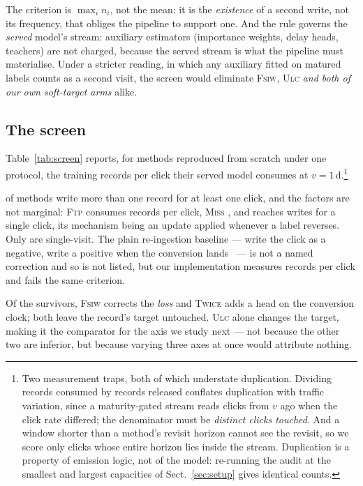 The criterion is $\max_i n_i$, not the mean: it is the \emph{existence} of a second write, not
its frequency, that obliges the pipeline to support one. And the rule governs the \emph{served} model's stream: auxiliary estimators (importance
weights, delay heads, teachers) are not charged, because the served stream is what the pipeline
must materialise. Under a stricter reading, in which any auxiliary fitted on matured labels
counts as a second visit, the screen would eliminate \textsc{Fsiw}, \textsc{Ulc} \emph{and
both of our own soft-target arms} alike.

\subsection{The screen}

Table~\ref{tab:screen} reports, for \nScreened{} methods reproduced from scratch under one
protocol, the training records per click their served model consumes at $v=1$\,d.\footnote{Two measurement traps, both of which understate duplication.
Dividing records consumed by records released conflates duplication with traffic variation,
since a maturity-gated stream reads clicks from $v$ ago when the click rate differed; the
denominator must be \emph{distinct clicks touched}. And a window shorter than a method's revisit
horizon cannot see the revisit, so we score only clicks whose entire horizon lies inside the
stream. Duplication is a property of emission logic, not of the model: re-running the audit at
the smallest and largest capacities of Sect.~\ref{sec:setup} gives identical counts.}

\begin{table}[t]
\centering
\caption{The single-visit screen at $v=1$\,d. \emph{Records/click} is the lifetime number of
training records the served model consumes per distinct click; \emph{max} is the largest for any
single click. \nFail{} of \nScreened{} methods write more than one.}
\label{tab:screen}

\end{table}

\nFail{} of \nScreened{} methods write more than one record for at least one click, and the
factors are not marginal: \textsc{Ftp} consumes \maxDup{} records per click, \textsc{Miss}
\missDup{}, and \maxVisitsArm{} reaches \maxVisits{} writes for a single click, its mechanism
being an update applied whenever a label reverses. Only \passList{} are single-visit. The plain
re-ingestion baseline --- write the click as a negative, write a positive when the conversion
lands~\cite{ktena2019addressing,gu2021real} --- is not a named correction and so is not listed,
but our implementation measures \vanillaDup{} records per click and fails the same criterion.

Of the survivors, \textsc{Fsiw} corrects the \emph{loss} and \textsc{Twice} adds a head on
the conversion clock; both leave the record's target untouched. \textsc{Ulc} alone changes the
target, making it the comparator for the axis we study next --- not because the other two are
inferior, but because varying three axes at once would attribute nothing.
